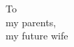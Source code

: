 \newpage
\vspace*{15 cm}

\begin{center}
{ \large
To \\
my parents, \\
my future wife\\
}
\end{center}

